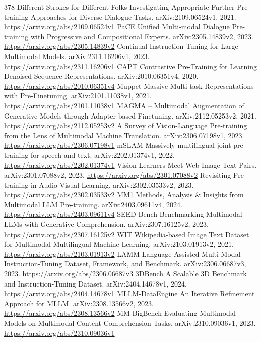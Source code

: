 \documentclass[11pt]{article}
\begin{document}
\begin{thebibliography}{378}
 Different Strokes for Different Folks Investigating Appropriate Further Pre-training Approaches for Diverse Dialogue Tasks. arXiv:2109.06524v1, 2021. \url{https://arxiv.org/abs/2109.06524v1}
 PaCE Unified Multi-modal Dialogue Pre-training with Progressive and Compositional Experts. arXiv:2305.14839v2, 2023. \url{https://arxiv.org/abs/2305.14839v2}
 Continual Instruction Tuning for Large Multimodal Models. arXiv:2311.16206v1, 2023. \url{https://arxiv.org/abs/2311.16206v1}
 CAPT Contrastive Pre-Training for Learning Denoised Sequence Representations. arXiv:2010.06351v4, 2020. \url{https://arxiv.org/abs/2010.06351v4}
 Muppet Massive Multi-task Representations with Pre-Finetuning. arXiv:2101.11038v1, 2021. \url{https://arxiv.org/abs/2101.11038v1}
 MAGMA -- Multimodal Augmentation of Generative Models through Adapter-based Finetuning. arXiv:2112.05253v2, 2021. \url{https://arxiv.org/abs/2112.05253v2}
 A Survey of Vision-Language Pre-training from the Lens of Multimodal Machine Translation. arXiv:2306.07198v1, 2023. \url{https://arxiv.org/abs/2306.07198v1}
 mSLAM Massively multilingual joint pre-training for speech and text. arXiv:2202.01374v1, 2022. \url{https://arxiv.org/abs/2202.01374v1}
 Vision Learners Meet Web Image-Text Pairs. arXiv:2301.07088v2, 2023. \url{https://arxiv.org/abs/2301.07088v2}
 Revisiting Pre-training in Audio-Visual Learning. arXiv:2302.03533v2, 2023. \url{https://arxiv.org/abs/2302.03533v2}
 MM1 Methods, Analysis \& Insights from Multimodal LLM Pre-training. arXiv:2403.09611v4, 2024. \url{https://arxiv.org/abs/2403.09611v4}
 SEED-Bench Benchmarking Multimodal LLMs with Generative Comprehension. arXiv:2307.16125v2, 2023. \url{https://arxiv.org/abs/2307.16125v2}
 WIT Wikipedia-based Image Text Dataset for Multimodal Multilingual Machine Learning. arXiv:2103.01913v2, 2021. \url{https://arxiv.org/abs/2103.01913v2}
 LAMM Language-Assisted Multi-Modal Instruction-Tuning Dataset, Framework, and Benchmark. arXiv:2306.06687v3, 2023. \url{https://arxiv.org/abs/2306.06687v3}
 3DBench A Scalable 3D Benchmark and Instruction-Tuning Dataset. arXiv:2404.14678v1, 2024. \url{https://arxiv.org/abs/2404.14678v1}
 MLLM-DataEngine An Iterative Refinement Approach for MLLM. arXiv:2308.13566v2, 2023. \url{https://arxiv.org/abs/2308.13566v2}
 MM-BigBench Evaluating Multimodal Models on Multimodal Content Comprehension Tasks. arXiv:2310.09036v1, 2023. \url{https://arxiv.org/abs/2310.09036v1}

\end{thebibliography}
\end{document}
